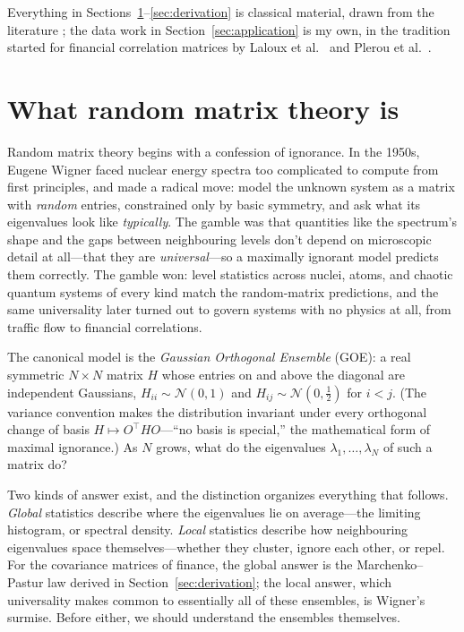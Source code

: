 \documentclass[11pt]{article}
\begin{document}
Everything in Sections~\ref{sec:rmt}--\ref{sec:derivation} is classical
material, drawn from the literature
\cite{wigner1958,mehta2004,marchenko1967,baisilverstein2010,bun2017}; the
data work in Section~\ref{sec:application} is my own, in the tradition
started for financial correlation matrices by Laloux et al.\
\cite{laloux1999} and Plerou et al.\ \cite{plerou2002}.

\section{What random matrix theory is}
\label{sec:rmt}

Random matrix theory begins with a confession of ignorance. In the 1950s,
Eugene Wigner faced nuclear energy spectra too complicated to compute from
first principles, and made a radical move: model the unknown system as a
matrix with \emph{random} entries, constrained only by basic symmetry, and
ask what its eigenvalues look like \emph{typically}. The gamble was that
quantities like the spectrum's shape and the gaps between neighbouring
levels don't depend on microscopic detail at all---that they are
\emph{universal}---so a maximally ignorant model predicts them correctly.
The gamble won: level statistics across nuclei, atoms, and chaotic quantum
systems of every kind match the random-matrix predictions, and the same
universality later turned out to govern systems with no physics at all,
from traffic flow to financial correlations.

The canonical model is the \emph{Gaussian Orthogonal Ensemble} (GOE): a
real symmetric $N\times N$ matrix $H$ whose entries on and above the
diagonal are independent Gaussians, $H_{ii}\sim\mathcal{N}(0,1)$ and
$H_{ij}\sim\mathcal{N}(0,\tfrac{1}{2})$ for $i<j$. (The variance convention
makes the distribution invariant under every orthogonal change of basis
$H\mapsto O^{\top}HO$---``no basis is special,'' the mathematical form of
maximal ignorance.) As $N$ grows, what do the eigenvalues
$\lambda_1,\dots,\lambda_N$ of such a matrix do?

Two kinds of answer exist, and the distinction organizes everything that
follows. \emph{Global} statistics describe where the eigenvalues lie on
average---the limiting histogram, or spectral density. \emph{Local}
statistics describe how neighbouring eigenvalues space themselves---whether
they cluster, ignore each other, or repel. For the covariance matrices of
finance, the global answer is the Marchenko--Pastur law derived in
Section~\ref{sec:derivation}; the local answer, which universality makes
common to essentially all of these ensembles, is Wigner's surmise. Before
either, we should understand the ensembles themselves.
\end{document}
